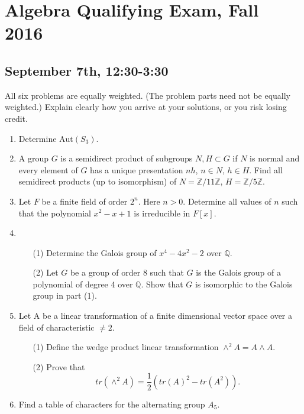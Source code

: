\documentclass{article}
\begin{document}
\section*{Algebra Qualifying Exam, Fall 2016}
\subsection*{September 7th, 12:30-3:30}

All six problems are equally weighted. (The problem parts need not be equally weighted.) Explain clearly how you arrive at your solutions, or you risk losing credit.

\begin{enumerate}
    \item Determine \(\text{Aut}(S_{3})\).

    \item A group \(G\) is a semidirect product of subgroups \(N,H\subset G\) if \(N\) is normal and every element of \(G\) has a unique presentation \(nh\), \(n\in N\), \(h\in H\). Find all semidirect products (up to isomorphism) of \(N=\mathbb{Z}/11\mathbb{Z}\), \(H=\mathbb{Z}/5\mathbb{Z}\).

    \item Let \(F\) be a finite field of order \(2^{n}\). Here \(n>0\). Determine all values of \(n\) such that the polynomial \(x^{2}-x+1\) is irreducible in \(F[x]\).

    \item 
    \begin{itemize}
        \item[(1)] Determine the Galois group of \(x^{4}-4x^{2}-2\) over \(\mathbb{Q}\).
        \item[(2)] Let \(G\) be a group of order 8 such that \(G\) is the Galois group of a polynomial of degree 4 over \(\mathbb{Q}\). Show that \(G\) is isomorphic to the Galois group in part (1).
    \end{itemize}

    \item Let A be a linear transformation of a finite dimensional vector space over a field of characteristic \(\neq 2\).
    \begin{itemize}
        \item[(1)] Define the wedge product linear transformation \(\wedge^{2}A=A\wedge A\).
        \item[(2)] Prove that
        \[tr(\wedge^{2}A)=\frac{1}{2}(tr(A)^{2}-tr(A^{2})).\]
    \end{itemize}

    \item Find a table of characters for the alternating group \(A_{5}\).
\end{enumerate}
\end{document}
